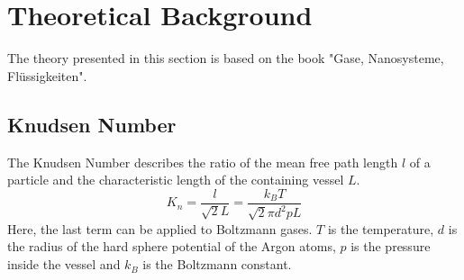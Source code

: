 \documentclass[a4paper,10pt]{article}
\begin{document}
\section{Theoretical Background}
The theory presented in this section is based on the book "Gase, Nanosysteme, Flüssigkeiten".\cite{bergmann}

\subsection{Knudsen Number}
The Knudsen Number describes the ratio of the mean free path length $l$ of a particle and the characteristic length of the containing vessel $L$.
\begin{equation}
  K_n = \frac{l}{\sqrt{2} L} = \frac{k_B T }{\sqrt{2} \pi d^2 p L}
\end{equation}
Here, the last term can be applied to Boltzmann gases. $T$ is the temperature, $d$ is the radius of the hard sphere potential of the Argon atoms, $p$ is the pressure inside the vessel and $k_B$ is the Boltzmann constant.
\end{document}

